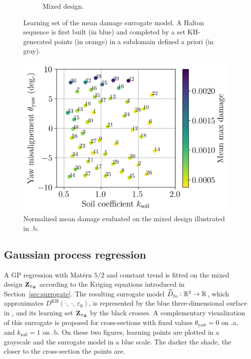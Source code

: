 \begin{figure}
\begin{subfigure}{0.48\linewidth}
        \caption{Mixed design.}
    \end{subfigure}
    \caption{Learning set of the mean damage surrogate model. A Halton sequence is first built (in blue) and completed by a set KH-generated points (in orange) in a subdomain defined a priori (in gray).}
    \label{fig:initial_doe}
\end{figure}

\begin{figure}[h!]
    \centering
    \includegraphics[width=0.6\linewidth]{./part3/figures/OWT/normalized_results_mean.png}
    \caption{Normalized mean damage evaluated on the mixed design illustrated in .b.}
    \label{fig:evaluated_doe}
\end{figure}


\subsection{Gaussian process regression}\label{sec:gp_owt}
A GP regression with Mat\'{e}rn $5/2$ and constant trend is fitted on the mixed design ${\bf Z}_{n_{\bf Z}}$ according to the Kriging equations introduced in Section~\ref{sec:surrogate}. 
The resulting surrogate model $\widetilde{D}_{\varepsilon_0}:\mathbb{R}^2 \rightarrow \mathbb{R}$, which approximates $D^{\mathrm{KH}}(\cdot, \, \cdot, \, \varepsilon_0)$, is represented by the blue three-dimensional surface in , and its learning set  ${\bf Z}_{n_{\bf Z}}$ by the black crosses.  
A complementary visualization of this surrogate is proposed for cross-sections with fixed values $\theta_{\mathrm{yaw}}=0$ on .a, and $k_{\mathrm{soil}}=1$ on .b. 
On these two figures, learning points are plotted in a grayscale and the surrogate model in a blue scale. 
The darker the shade, the closer to the cross-section the points are. 

